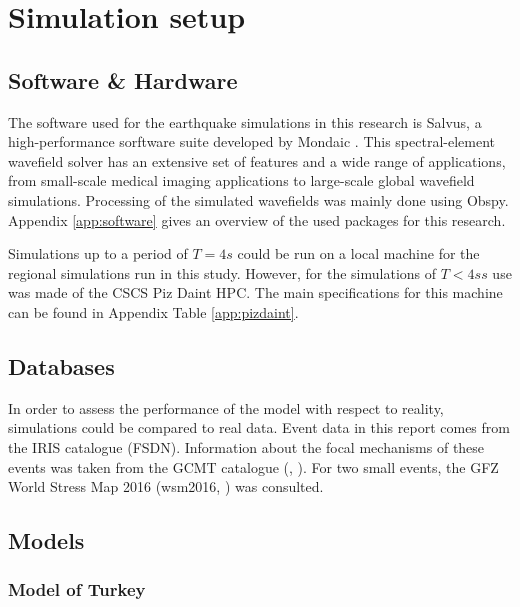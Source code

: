\documentclass[../Text/00main.tex]{subfiles}
\begin{document}

\section{Simulation setup}




\subsection{Software \& Hardware}

The software used for the earthquake simulations in this research is Salvus, a high-performance sorftware suite developed by Mondaic \cite{afanasiev_modular_2019}. This spectral-element wavefield solver has an extensive set of features and a wide range of applications, from small-scale medical imaging applications to large-scale global wavefield simulations. Processing of the simulated wavefields was mainly done using Obspy. Appendix \ref{app:software} gives an overview of the used packages for this research. 

Simulations up to a period of $T = 4 s$ could be run on a local machine for the regional simulations run in this study. However, for the simulations of $T < 4 s s$ use was made of the CSCS Piz Daint HPC. The main specifications for this machine can be found in Appendix Table \ref{app:pizdaint}. 


\subsection{Databases}


In order to assess the performance of the model with respect to reality, simulations could be compared to real data. Event data in this report comes from the IRIS catalogue (FSDN). Information about the focal mechanisms of these events was taken from the GCMT catalogue (\cite{dziewonski_determination_1981}, \cite{ekstromdziewo}). For two small events, the GFZ World Stress Map 2016 (wsm2016, \cite{heidbach2016world}) was consulted.

\subsection{Models}

\subsubsection{Model of Turkey}
\end{document}
